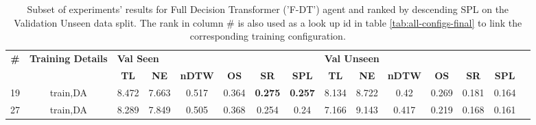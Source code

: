 \begin{table}
\centering
\caption{\label{tab:f_dt_dagger}Subset of experiments' results for Full Decision Transformer ('F-DT') agent and ranked by descending SPL on the Validation Unseen data split. The rank in column \# is also used as a look up id in table \ref{tab:all-configs-final} to link the corresponding training configuration.}
\begin{tabular}{@{\hskip3pt}c@{\hskip3pt}c@{\hskip3pt}c@{\hskip3pt}c@{\hskip3pt}c@{\hskip3pt}c@{\hskip3pt}c@{\hskip3pt}c@{\hskip3pt}c@{\hskip3pt}c@{\hskip3pt}c@{\hskip3pt}c@{\hskip3pt}c@{\hskip3pt}c@{\hskip3pt}c}
\toprule
\textbf{\#} & \textbf{Training Details} & \multicolumn{6}{l}{\textbf{Val Seen}} & \multicolumn{6}{l}{\textbf{Val Unseen}} \\
 \textbf{~} &                \textbf{~} &       \textbf{TL} & \textbf{NE} & \textbf{nDTW} & \textbf{OS} &     \textbf{SR} &    \textbf{SPL} &         \textbf{TL} & \textbf{NE} & \textbf{nDTW} & \textbf{OS} & \textbf{SR} & \textbf{SPL} \\
\midrule
         19 &                  train,DA &             8.472 &       7.663 &         0.517 &       0.364 &  \textbf{0.275} &  \textbf{0.257} &               8.134 &       8.722 &          0.42 &       0.269 &       0.181 &        0.164 \\
         27 &                  train,DA &             8.289 &       7.849 &         0.505 &       0.368 &           0.254 &            0.24 &               7.166 &       9.143 &         0.417 &       0.219 &       0.168 &        0.161 \\
\bottomrule
\end{tabular}
\end{table}
